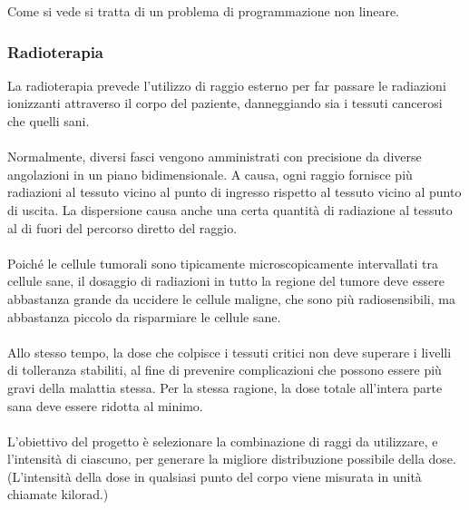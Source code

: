 \documentclass[a4paper, 11pt]{article}
\begin{document}
            Come si vede si tratta di un problema di programmazione non
            lineare.
            
            \subsubsection*{Radioterapia}

            La radioterapia prevede l’utilizzo di raggio esterno per far passare le radiazioni ionizzanti
            attraverso il corpo del paziente, danneggiando sia i tessuti cancerosi che quelli sani.
            
            \paragraph{}
            Normalmente, diversi fasci vengono amministrati con precisione da diverse angolazioni in
            un piano bidimensionale. A causa, ogni raggio fornisce più radiazioni al tessuto vicino al punto di ingresso rispetto al tessuto vicino al punto di uscita. La dispersione causa anche una certa quantità di radiazione al tessuto al di fuori del percorso diretto del raggio.
            
            \paragraph{}
            Poiché le cellule tumorali sono tipicamente microscopicamente intervallati tra cellule sane,
            il dosaggio di radiazioni in tutto la regione del tumore deve essere abbastanza grande da
            uccidere le cellule maligne, che sono più radiosensibili, ma abbastanza piccolo da risparmiare le cellule sane.
            
            \paragraph{}
            Allo stesso tempo, la dose che colpisce i tessuti critici non deve superare i livelli di
            tolleranza stabiliti, al fine di prevenire complicazioni che possono essere più gravi della
            malattia stessa. Per la stessa ragione, la dose totale all’intera parte sana deve essere ridotta
            al minimo.

            \paragraph{}
            L’obiettivo del progetto è selezionare la combinazione di raggi da utilizzare, e l’intensità di ciascuno, per generare la migliore distribuzione possibile della dose. (L’intensità della dose in qualsiasi punto del corpo viene misurata in unità chiamate kilorad.)
\end{document}
